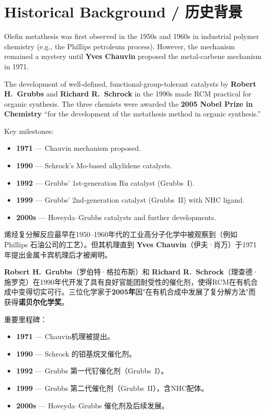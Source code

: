 \documentclass[11pt, a4paper]{article}
\begin{document}
\section{Historical Background / 历史背景}

\begin{enbox}[English]
Olefin metathesis was first observed in the 1950s and 1960s in industrial polymer chemistry (e.g., the Phillips petroleum process).  However, the mechanism remained a mystery until \textbf{Yves Chauvin} proposed the metal-carbene mechanism in 1971.

The development of well-defined, functional-group-tolerant catalysts by \textbf{Robert H.\ Grubbs} and \textbf{Richard R.\ Schrock} in the 1990s made RCM practical for organic synthesis.  The three chemists were awarded the \textbf{2005 Nobel Prize in Chemistry} ``for the development of the metathesis method in organic synthesis.''

Key milestones:
\begin{itemize}[nosep]
  \item \textbf{1971} — Chauvin mechanism proposed.
  \item \textbf{1990} — Schrock's Mo-based alkylidene catalysts.
  \item \textbf{1992} — Grubbs' 1st-generation Ru catalyst (Grubbs~I).
  \item \textbf{1999} — Grubbs' 2nd-generation catalyst (Grubbs~II) with NHC ligand.
  \item \textbf{2000s} — Hoveyda--Grubbs catalysts and further developments.
\end{itemize}
\end{enbox}

\begin{cnbox}[中文]
烯烃复分解反应最早在1950--1960年代的工业高分子化学中被观察到（例如 Phillips 石油公司的工艺）。但其机理直到 \textbf{Yves Chauvin}（伊夫·肖万）于1971年提出金属卡宾机理后才被阐明。

\textbf{Robert H.\ Grubbs}（罗伯特·格拉布斯）和 \textbf{Richard R.\ Schrock}（理查德·施罗克）在1990年代开发了具有良好官能团耐受性的催化剂，使得RCM在有机合成中变得切实可行。三位化学家于\textbf{2005年}因"在有机合成中发展了复分解方法"而获得\textbf{诺贝尔化学奖}。

重要里程碑：
\begin{itemize}[nosep]
  \item \textbf{1971} — Chauvin机理被提出。
  \item \textbf{1990} — Schrock 的钼基烷叉催化剂。
  \item \textbf{1992} — Grubbs 第一代钌催化剂（Grubbs~I）。
  \item \textbf{1999} — Grubbs 第二代催化剂（Grubbs~II），含NHC配体。
  \item \textbf{2000s} — Hoveyda--Grubbs 催化剂及后续发展。
\end{itemize}
\end{cnbox}
\end{document}
